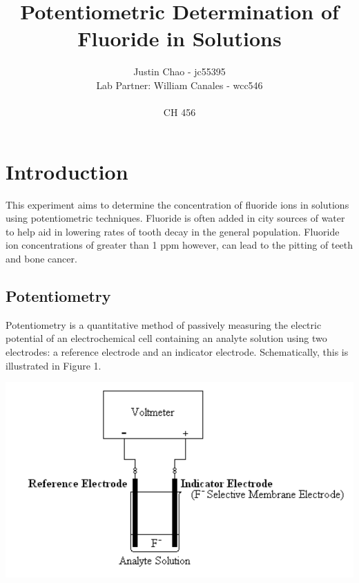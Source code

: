 \documentclass{article}
\begin{document}
 
\title { Potentiometric Determination of Fluoride in Solutions }
\vspace{20cm} 
\author {Justin Chao - jc55395 
\\ Lab Partner: William Canales - wcc546 
\\ \\ CH 456} 

\maketitle

\newpage
\section {Introduction}
This experiment aims to determine the concentration of fluoride ions in
solutions using potentiometric techniques. Fluoride is often added in city
sources of water to help aid in lowering rates of tooth decay in the general
population. Fluoride ion concentrations of greater than 1 ppm however, can lead
to the pitting of teeth and bone cancer.

\subsection {Potentiometry}
Potentiometry is a quantitative method of passively measuring the electric
potential of an electrochemical cell containing an analyte solution using two
electrodes: a reference electrode and an indicator electrode. Schematically, this
is illustrated in Figure 1.

\begin{center}
    \includegraphics[scale=0.6]{meter}
\end{center}
\end{document}
